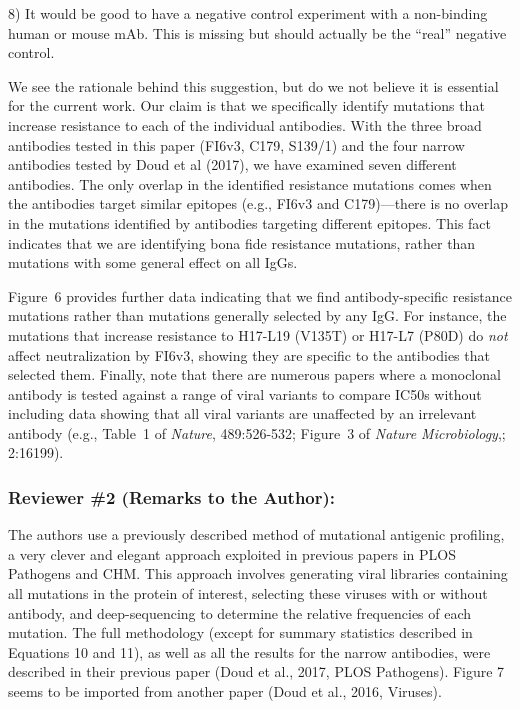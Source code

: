 \documentclass[11pt, oneside]{article}   	%
\begin{document}
8) It would be good to have a negative control experiment with a non-binding human or mouse mAb. This is missing but should actually be the ``real'' negative control.

{\color{black}
We see the rationale behind this suggestion, but do we not believe it is essential for the current work. 
Our claim is that we specifically identify mutations that increase resistance to each of the individual antibodies.
With the three broad antibodies tested in this paper (FI6v3, C179, S139/1) and the four narrow antibodies tested by Doud et al (2017), we have examined seven different antibodies.
The only overlap in the identified resistance mutations comes when the antibodies target similar epitopes (e.g., FI6v3 and C179)---there is no overlap in the mutations identified by antibodies targeting different epitopes.
This fact indicates that we are identifying bona fide resistance mutations, rather than mutations with some general effect on all IgGs.

Figure~6 provides further data indicating that we find antibody-specific resistance mutations rather than mutations generally selected by any IgG.
For instance, the mutations that increase resistance to H17-L19 (V135T) or H17-L7 (P80D) do \emph{not} affect neutralization by FI6v3, showing they are specific to the antibodies that selected them.
Finally, note that there are numerous papers where a monoclonal antibody is tested against a range of viral variants to compare IC50s without including data showing that all viral variants are unaffected by an irrelevant antibody (e.g., Table~1 of \textit{Nature}, 489:526-532; Figure~3 of \textit{Nature Microbiology},; 2:16199).
}

\subsubsection*{Reviewer \#2 (Remarks to the Author):}

The authors use a previously described method of mutational antigenic profiling, a very clever and elegant approach exploited in previous papers in PLOS Pathogens and CHM. This approach involves generating viral libraries containing all mutations in the protein of interest, selecting these viruses with or without antibody, and deep-sequencing to determine the relative frequencies of each mutation. The full methodology (except for summary statistics described in Equations 10 and 11), as well as all the results for the narrow antibodies, were described in their previous paper (Doud et al., 2017, PLOS Pathogens). Figure 7 seems to be imported from another paper (Doud et al., 2016, Viruses).
\end{document}
